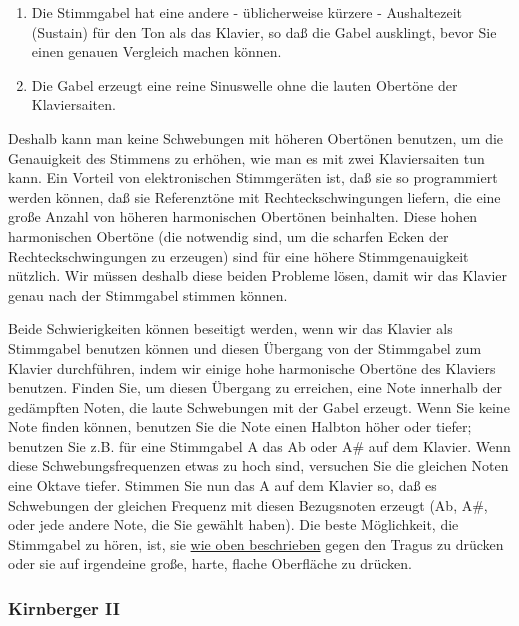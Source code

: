 \begin{enumerate}[label={\arabic*.}] 
 \item Die Stimmgabel hat eine andere - üblicherweise kürzere - Aushaltezeit (Sustain) für den Ton als das
 Klavier, so daß die Gabel ausklingt, bevor Sie einen genauen Vergleich machen können.
 \item Die Gabel erzeugt eine reine Sinuswelle ohne die lauten Obertöne der Klaviersaiten.
 \end{enumerate}
Deshalb kann man keine Schwebungen mit höheren Obertönen benutzen, um die Genauigkeit des Stimmens zu erhöhen, wie man es mit zwei Klaviersaiten tun kann.
Ein Vorteil von elektronischen Stimmgeräten ist, daß sie so programmiert werden können, daß sie Referenztöne mit Rechteckschwingungen liefern, die eine große Anzahl von höheren harmonischen Obertönen beinhalten.
Diese hohen harmonischen Obertöne (die notwendig sind, um die scharfen Ecken der Rechteckschwingungen zu erzeugen) sind für eine höhere Stimmgenauigkeit nützlich.
Wir müssen deshalb diese beiden Probleme lösen, damit wir das Klavier genau nach der Stimmgabel stimmen können.

Beide Schwierigkeiten können beseitigt werden, wenn wir das Klavier als Stimmgabel benutzen können und diesen Übergang von der Stimmgabel zum Klavier durchführen, indem wir einige hohe harmonische Obertöne des Klaviers benutzen.
Finden Sie, um diesen Übergang zu erreichen, eine Note innerhalb der gedämpften Noten, die laute Schwebungen mit der Gabel erzeugt.
Wenn Sie keine Note finden können, benutzen Sie die Note einen Halbton höher oder tiefer; benutzen Sie z.B. für eine Stimmgabel A das Ab oder A\# auf dem Klavier.
Wenn diese Schwebungsfrequenzen etwas zu hoch sind, versuchen Sie die gleichen Noten eine Oktave tiefer.
Stimmen Sie nun das A auf dem Klavier so, daß es Schwebungen der gleichen Frequenz mit diesen Bezugsnoten erzeugt (Ab, A\#, oder jede andere Note, die Sie gewählt haben).
Die beste Möglichkeit, die Stimmgabel zu hören, ist, sie \hyperref[c2_3_gabel]{wie oben beschrieben} gegen den Tragus zu drücken oder sie auf irgendeine große, harte, flache Oberfläche zu drücken.
 

\label{c2_6c}
\subsubsection{Kirnberger II}
\label{c2_6_kirn}

